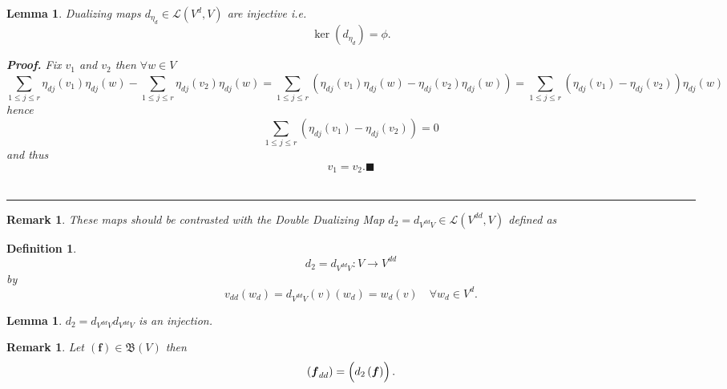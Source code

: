\documentclass[aps,preprint]{revtex4}
\newtheorem{definition}[theorem]{Definition}
\newtheorem{lemma}[theorem]{Lemma}
\newtheorem{remark}[theorem]{Remark}
\newenvironment{proof}[1][Proof]{\noindent\textbf{#1.} }{\ \rule{0.5em}{0.5em}}
\begin{document}
\begin{lemma}
\emph{Dualizing maps} $d_{\eta _{d}}\in \mathcal{L}\left( V^{d},V\right) $
are \emph{injective} i.e. 
\begin{equation}
\ker \left( d_{\eta _{d}}\right) =\phi .
\end{equation}

\begin{proof}
Fix $v_{1}$ and $v_{2}$ then $\forall w\in V$ 
\begin{equation}
\sum_{1\leq j\leq r}\eta _{dj}\left( \overset{}{v_{1}}\right) \eta
_{dj}\left( w\right) -\sum_{1\leq j\leq r}\eta _{dj}\left( \overset{}{v_{2}}%
\right) \eta _{dj}\left( w\right) =\sum_{1\leq j\leq r}\left( \eta
_{dj}\left( v_{1}\right) \eta _{dj}\left( w\right) -\eta _{dj}\left(
v_{2}\right) \eta _{dj}\left( w\right) \right) =\sum_{1\leq j\leq r}\left(
\eta _{dj}\left( v_{1}\right) -\eta _{dj}\left( v_{2}\right) \right) \eta
_{dj}\left( w\right)
\end{equation}%
hence 
\begin{equation}
\sum_{1\leq j\leq r}\left( \eta _{dj}\left( v_{1}\right) -\eta _{dj}\left(
v_{2}\right) \right) =0
\end{equation}%
and thus 
\begin{equation}
v_{1}=v_{2}.\blacksquare
\end{equation}
\end{proof}
\end{lemma}

\begin{remark}
\label{Double Dual} These maps should be contrasted with \emph{the} \emph{%
Double Dualizing Map} $d_{2}=d_{V^{dd}V}\in \mathcal{L}\left(
V^{dd},V\right) $ defined as
\end{remark}

\begin{definition}
\begin{equation}
d_{2}=d_{V^{dd}V}:V\rightarrow V^{dd}
\end{equation}%
by 
\begin{equation}
v_{dd}\left( w_{d}\right) =d_{V^{dd}V}\left( v\right) \left( w_{d}\right)
=w_{d}\left( v\right) \quad \forall w_{d}\in V^{d}.
\end{equation}
\end{definition}

\begin{lemma}
$d_{2}=d_{V^{dd}V}d_{V^{dd}V}$ is an injection.
\end{lemma}

\begin{remark}
Let $\left( \boldsymbol{f}\right) \in \mathfrak{B}\left( V\right) $ then 
\begin{equation}
\left( \boldsymbol{f}_{dd}\right) =\left( \overset{}{d_{2}\left( \boldsymbol{%
f}\right) }\right) .
\end{equation}
\end{remark}
\end{document}
